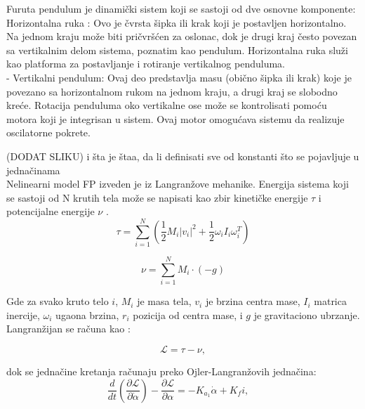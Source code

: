 \documentclass[a4paper,11pt]{article}
\theoremstyle{definition} \newtheorem{deff}{Definicija}[section]
\theoremstyle{definition} \newtheorem{prim}[deff]{Primer}
\theoremstyle{plain} \newtheorem{teor}[deff]{Teorema}
\begin{document}
	Furuta pendulum je dinamički sistem koji se sastoji od dve osnovne komponente: \\
	
	Horizontalna ruka : Ovo je čvrsta šipka ili krak koji je postavljen horizontalno. Na jednom kraju može biti pričvršćen za oslonac, dok je drugi kraj često povezan sa vertikalnim delom sistema, poznatim kao pendulum. Horizontalna ruka služi kao platforma za postavljanje i rotiranje vertikalnog penduluma. \\
	
	- Vertikalni pendulum: Ovaj deo predstavlja masu (obično šipka ili krak) koje je povezano sa horizontalnom rukom na jednom kraju, a drugi kraj se slobodno kreće. Rotacija penduluma oko vertikalne ose može se kontrolisati pomoću motora koji je integrisan u sistem. Ovaj motor omogućava sistemu da realizuje oscilatorne pokrete.
	
	(DODAT SLIKU) i šta je štaa, da li definisati sve od konstanti što se pojavljuje u jednačinama
	\\
	
	Nelinearni model FP izveden je iz Langranžove mehanike. Energija sistema koji se sastoji od N krutih tela može se napisati kao zbir kinetičke energije $\tau$ i potencijalne energije $\nu$ \cite{inicijalna}. 
	\begin{equation}
		\tau = \sum_{i=1}^{N} \left( \frac{1}{2} M_i |v_i|^2 + \frac{1}{2} \omega_i I_i \omega_i^T \right)
	\end{equation}
	
	\begin{equation}
		\nu = \sum_{i=1}^{N} M_i \cdot (-g)
	\end{equation}
	
	
	
	Gde za svako kruto telo $i$, $M_i$ je masa tela, $v_i$ je brzina centra mase, $I_i$ matrica inercije, $\omega_i$ ugaona brzina, $r_i$ pozicija od centra mase, i $g$ je gravitaciono ubrzanje.\\
	
	Langranžijan se računa kao :
	
	\begin{equation}
		\mathcal{L} = \tau - \nu, 
	\end{equation}
	
	dok se jednačine kretanja računaju preko Ojler-Langranžovih jednačina: 
	\begin{equation}
		\frac{d}{dt} \left(\frac{\partial \mathcal{L}}{\partial \dot\alpha}\right) - \frac{\partial \mathcal{L}}{\partial \alpha} = -K_{a_1} \dot\alpha + K_f i, \quad 
	\end{equation}
	
\end{document}
